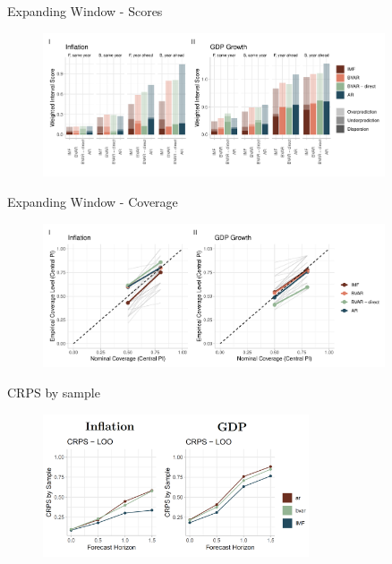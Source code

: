 \documentclass[en]{sdqbeamer}
\begin{document}
\begin{frame}{Expanding Window - Scores}
\label{extractionmethod}
\begin{figure}
        \centering
        \includegraphics[width=0.9\textwidth]{figures/wis_cpigdp_new_ew.pdf}
    \end{figure}
\end{frame}
\begin{frame}{Expanding Window - Coverage}
\begin{figure}
        \centering
        \includegraphics[width=0.9\textwidth]{figures/coverage_ew.pdf}
    \end{figure}
\end{frame}


\begin{frame}{CRPS by sample}
\label{samplecrps}
\begin{figure}
        \centering
        \includegraphics[width=0.7\textwidth]{figures/crpssample.png}
    \end{figure}
\end{frame}
\end{document}
